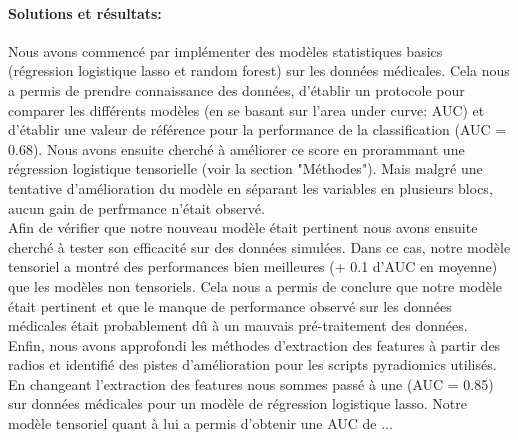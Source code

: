 \documentclass[10pt]{article}
\begin{document}
\paragraph{Solutions et résultats:} Nous avons commencé par implémenter des modèles statistiques basics (régression logistique lasso et random forest) sur les données médicales. Cela nous a permis de prendre connaissance des données, d'établir un protocole pour comparer les différents modèles (en se basant sur l'area under curve: AUC) et d'établir une valeur de référence pour la performance de la classification (AUC = 0.68). Nous avons ensuite cherché à améliorer ce score en prorammant une régression logistique tensorielle (voir la section "Méthodes"). Mais malgré une tentative d'amélioration du modèle en séparant les variables en plusieurs blocs, aucun gain de perfrmance n'était observé.\\
\indent Afin de vérifier que notre nouveau modèle était pertinent nous avons ensuite cherché à tester son efficacité sur des données simulées. Dans ce cas, notre modèle tensoriel a montré des performances bien meilleures (+ 0.1 d'AUC en moyenne) que les modèles non tensoriels. Cela nous a permis de conclure que notre modèle était pertinent et que le manque de performance observé sur les données médicales était probablement dû à un mauvais pré-traitement des données.\\
\indent Enfin, nous avons approfondi les méthodes d'extraction des features à partir des radios et identifié des pistes d'amélioration pour les scripts pyradiomics utilisés. En changeant l'extraction des features nous sommes passé à une (AUC = 0.85) sur données médicales pour un modèle de régression logistique lasso. Notre modèle tensoriel quant à lui a permis d'obtenir une AUC de ...

\newpage
\tableofcontents
\newpage
\end{document}
